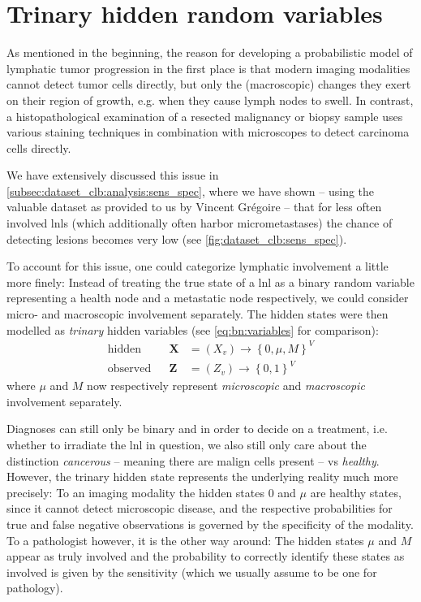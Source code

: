 \documentclass[\relativeRoot/main.tex]{subfiles}
\begin{document}
\section{Trinary hidden random variables}
\label{sec:extensions:trinary}

As mentioned in the beginning, the reason for developing a probabilistic model of lymphatic tumor progression in the first place is that modern imaging modalities cannot detect tumor cells directly, but only the (macroscopic) changes they exert on their region of growth, e.g. when they cause lymph nodes to swell. In contrast, a histopathological examination of a resected malignancy or biopsy sample uses various staining techniques in combination with microscopes to detect carcinoma cells directly.

We have extensively discussed this issue in \cref{subsec:dataset_clb:analysis:sens_spec}, where we have shown -- using the valuable dataset as provided to us by Vincent Grégoire -- that for less often involved \glspl{lnl} (which additionally often harbor micrometastases) the chance of detecting lesions becomes very low (see \cref{fig:dataset_clb:sens_spec}).

To account for this issue, one could categorize lymphatic involvement a little more finely: Instead of treating the true state of a \gls{lnl} as a binary random variable representing a health node and a metastatic node respectively, we could consider micro- and macroscopic involvement separately. The hidden states were then modelled as \emph{trinary} hidden variables (see \cref{eq:bn:variables} for comparison):
%
\begin{equation}
    \begin{aligned}
        \text{hidden}& & \mathbf{X} &= \left( X_v \right) \rightarrow \left\{ 0, \mu, M \right\}^V \\
        \text{observed}& & \mathbf{Z} &= \left( Z_v \right) \rightarrow \left\{ 0,1 \right\}^V
    \end{aligned}
\end{equation}
%
where $\mu$ and $M$ now respectively represent \emph{microscopic} and \emph{macroscopic} involvement separately.

Diagnoses can still only be binary and in order to decide on a treatment, i.e. whether to irradiate the \gls{lnl} in question, we also still only care about the distinction \emph{cancerous} -- meaning there are malign cells present -- vs \emph{healthy}. However, the trinary hidden state represents the underlying reality much more precisely: To an imaging modality the hidden states $0$ and $\mu$ are healthy states, since it cannot detect microscopic disease, and the respective probabilities for true and false negative observations is governed by the specificity of the modality. To a pathologist however, it is the other way around: The hidden states $\mu$ and $M$ appear as truly involved and the probability to correctly identify these states as involved is given by the sensitivity (which we usually assume to be one for pathology).
\end{document}
